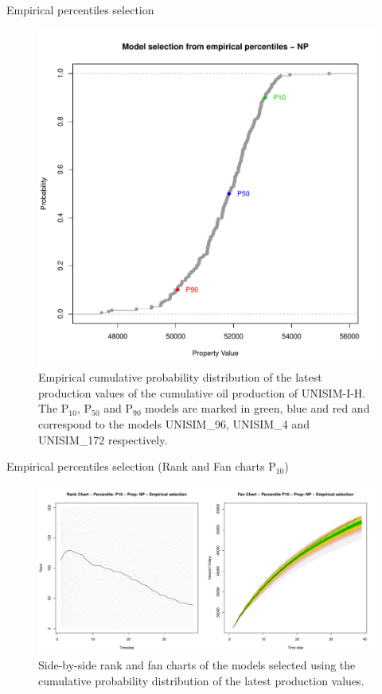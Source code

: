 \documentclass{beamer}
\begin{document}
\begin{frame}{Empirical percentiles selection}
  \begin{figure}[H]
    \centering
    \includegraphics[width=0.48\columnwidth]{ecdf-NP.pdf}
    \caption{Empirical cumulative probability distribution of the latest production values of the cumulative oil production of UNISIM-I-H. The P$_{10}$, P$_{50}$ and P$_{90}$ models are marked in green, blue and red and correspond to the models UNISIM\_96, UNISIM\_4 and UNISIM\_172 respectively.}
    \label{fig:ecdf-NP}
  \end{figure}
\end{frame}

\begin{frame}{Empirical percentiles selection (Rank and Fan charts P$_{10}$)}
  \begin{figure}[H]
    \centering
    \includegraphics[width=\columnwidth]{rank-fan-ecdf-p10.pdf}
    \caption{Side-by-side rank and fan charts of the models selected using the cumulative probability distribution of the latest production values.}
    \label{fig:rank-fan-ecdf}
  \end{figure}
\end{frame}
\end{document}
